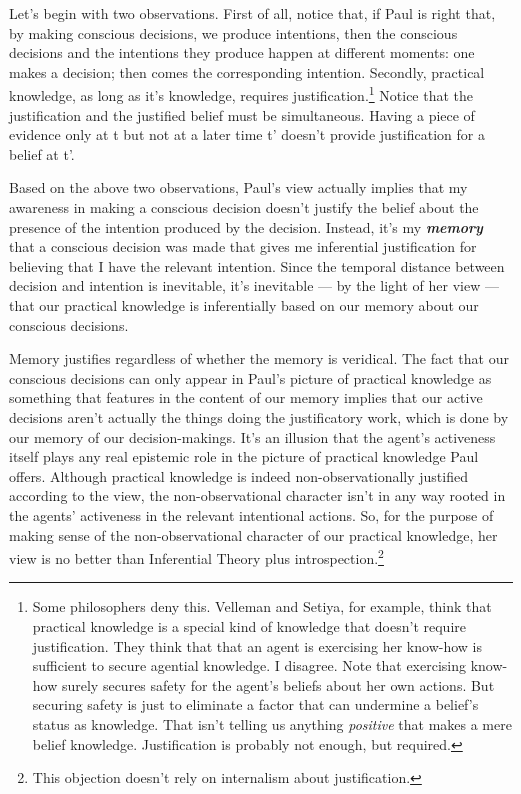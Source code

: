 \documentclass[a4paper,12pt]{article}
\begin{document}
Let's begin with two observations. First of all, notice that, if Paul is right that, by making conscious decisions, we produce intentions, then the conscious decisions and the intentions they produce happen at different moments: one makes a decision; then comes the corresponding intention. Secondly, practical knowledge, as long as it's knowledge, requires justification.\footnote{Some philosophers deny this. Velleman and Setiya, for example, think that practical knowledge is a special kind of knowledge that doesn't require justification. They think that that an agent is exercising her know-how is sufficient to secure agential knowledge. I disagree. Note that exercising know-how surely secures safety for the agent's beliefs about her own actions. But securing safety is just to eliminate a factor that can undermine a belief's status as knowledge. That isn't telling us anything \emph{positive} that makes a mere belief knowledge. Justification is probably not enough, but required.} Notice that the justification and the justified belief must be simultaneous. Having a piece of evidence only at t but not at a later time t' doesn't provide justification for a belief at t'.

Based on the above two observations, Paul's view actually implies that my awareness in making a conscious decision doesn't justify the belief about the presence of the intention produced by the decision. Instead, it's my \emph{\textbf{memory}} that a conscious decision was made that gives me inferential justification for believing that I have the relevant intention. Since the temporal distance between decision and intention is inevitable, it's inevitable --- by the light of her view --- that our practical knowledge is inferentially based on our memory about our conscious decisions.

Memory justifies regardless of whether the memory is veridical. The fact that our conscious decisions can only appear in Paul's picture of practical knowledge as something that features in the content of our memory implies that our active decisions aren't actually the things doing the justificatory work, which is done by our memory of our decision-makings. It's an illusion that the agent's activeness itself plays any real epistemic role in the picture of practical knowledge Paul offers. Although practical knowledge is indeed non-observationally justified according to the view, the non-observational character isn't in any way rooted in the agents' activeness in the relevant intentional actions. So, for the purpose of making sense of the non-observational character of our practical knowledge, her view is no better than Inferential Theory plus introspection.\footnote{This objection doesn't rely on internalism about justification.}
\end{document}

